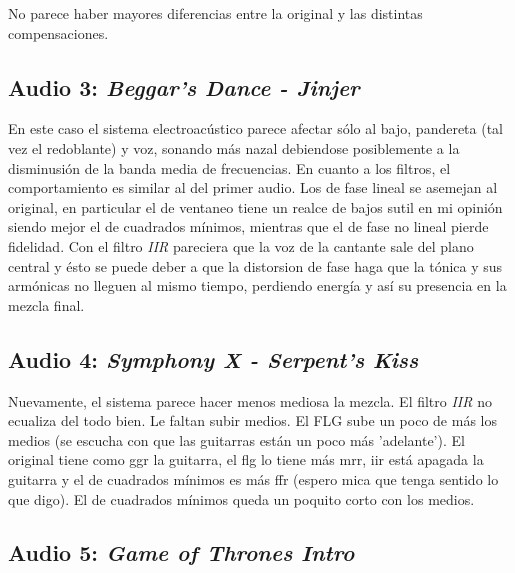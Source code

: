 	No parece haber mayores diferencias entre la original y las distintas compensaciones.
		
	\subsection{Audio 3: \emph{Beggar's Dance - Jinjer}}
	
	En este caso el sistema electroacústico parece afectar sólo al bajo, pandereta (tal vez el redoblante) y voz, sonando más nazal debiendose posiblemente a la disminusión de la banda media de frecuencias. En cuanto a los filtros, el comportamiento es similar al del primer audio. Los de fase lineal se asemejan al original, en particular el de ventaneo tiene un realce de bajos sutil en mi opinión siendo mejor el de cuadrados mínimos, mientras que el de fase no lineal pierde fidelidad. Con el filtro \emph{IIR} pareciera que la voz de la cantante sale del plano central y ésto se puede deber a que la distorsion de fase haga que la tónica y sus armónicas no lleguen al mismo tiempo, perdiendo energía y así su presencia en la mezcla final.
			
	\subsection{Audio 4: \emph{Symphony X - Serpent's Kiss}}
	
	Nuevamente, el sistema parece hacer menos mediosa la mezcla. El filtro \emph{IIR} no ecualiza del todo bien. Le faltan subir medios. El FLG sube un poco de más los medios (se escucha con que las guitarras están un poco más 'adelante'). El original tiene como ggr la guitarra, el flg lo tiene más mrr, iir está apagada la guitarra y el de cuadrados mínimos es más ffr (espero mica que tenga sentido lo que digo). El de cuadrados mínimos queda un poquito corto con los medios.

				
	\subsection{Audio 5: \emph{Game of Thrones Intro}}
	
